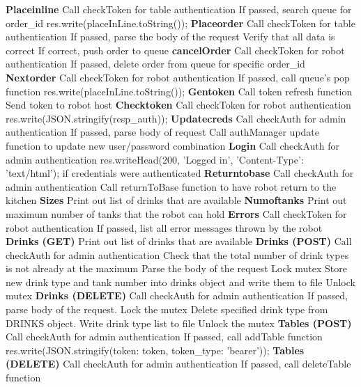 \documentclass [10pt]{article}
\begin{document}
\textbf{Placeinline}
Call checkToken for table authentication
If passed, search queue for order\_id
res.write(placeInLine.toString());
\newline\textbf{Placeorder}
Call checkToken for table authentication
If passed, parse the body of the request
Verify that all data is correct
If correct, push order to queue
\newline\textbf{cancelOrder}
Call checkToken for robot authentication
If passed, delete order from queue for specific order\_id
\newline\textbf{Nextorder}
Call checkToken for robot authentication
If passed, call queue's pop function
res.write(placeInLine.toString());
\newline\textbf{Gentoken}
Call token refresh function
Send token to robot host
\newline\textbf{Checktoken}
Call checkToken for robot authentication
res.write(JSON.stringify(resp\_auth));
\newline\textbf{Updatecreds}
Call checkAuth for admin authentication
If passed, parse body of request
Call authManager update function to update new user/password combination
\newline\textbf{Login}
Call checkAuth for admin authentication
res.writeHead(200, 'Logged in', {'Content-Type': 'text/html'}); if credentials were authenticated
\newline\textbf{Returntobase}
Call checkAuth for admin authentication
Call returnToBase function to have robot return to the kitchen
\newline\textbf{Sizes}
Print out list of drinks that are available
\newline\textbf{Numoftanks}
Print out maximum number of tanks that the robot can hold
\newline\textbf{Errors}
Call checkToken for robot authentication
If passed, list all error messages thrown by the robot
\newline\textbf{Drinks (GET)}
Print out list of drinks that are available
\newline\textbf{Drinks (POST)}
Call checkAuth for admin authentication
Check that the total number of drink types is not already at the maximum
Parse the body of the request
Lock mutex
Store new drink type and tank number into drinks object and write them to file
Unlock mutex
\newline\textbf{Drinks (DELETE)}
Call checkAuth for admin authentication
If passed, parse body of the request. Lock the mutex
Delete specified drink type from DRINKS object. Write drink type list to file
Unlock the mutex
\newline\textbf{Tables (POST)}
Call checkAuth for admin authentication
If passed, call addTable function
res.write(JSON.stringify({token: token, token\_type: 'bearer'}));
\newline\textbf{Tables (DELETE)}
Call checkAuth for admin authentication
If passed, call deleteTable function
\end{document}
